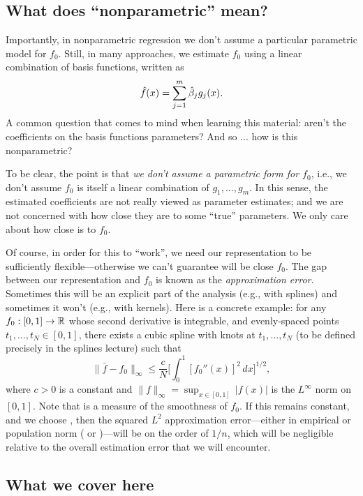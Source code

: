 \documentclass{article}
\begin{document}
\subsection{What does ``nonparametric'' mean?}

Importantly, in nonparametric regression we don't assume a particular parametric
model for $f_0$. Still, in many approaches, we estimate $f_0$ using a linear
combination of basis functions, written as   
\[
\hat{f}(x) = \sum_{j=1}^m \hat{\beta}_j g_j(x). 
\]
A common question that comes to mind when learning this material: aren't the
coefficients on the basis functions parameters? And so ... how is this
nonparametric?      

To be clear, the point is that \emph{we don't assume a parametric form for
  $f_0$}, i.e., we don't assume $f_0$ is itself a linear combination of
$g_1,\dots,g_m$. In this sense, the estimated coefficients
 are not really viewed as parameter estimates; 
and we are not concerned with how close they are to some ``true'' parameters. We 
only care about how close \smash{$\hf$} is to $f_0$.

Of course, in order for this to ``work'', we need our representation to be
sufficiently flexible---otherwise we can't guarantee \smash{$\hf$} will be close 
$f_0$. The gap between our representation and $f_0$ is known as the
\emph{approximation error}. Sometimes this will be an explicit part of the
analysis (e.g., with splines) and sometimes it won't (e.g., with kernels). Here
is a concrete example: for any $f_0 : [0,1] \to \mathbb{R}$ whose second derivative is
integrable, and evenly-spaced points $t_1,\dots,t_N \in [0,1]$, there exists a
cubic spline  with knots at $t_1,\dots,t_N$ (to be defined
precisely in the splines lecture) such that
\[
\|\bar{f} - f_0\|_\infty \leq \frac{c}{N} \bigg[ \int_0^1 [f_0''(x)]^2 \, dx
\bigg]^{1/2},  
\]
where $c>0$ is a constant and $\|f\|_\infty = \sup_{x \in [0,1]} \, |f(x)|$ is
the $L^\infty$ norm on $[0,1]$. Note that 
is a measure of the smoothness of $f_0$. If this remains constant, and we choose 
, then the squared $L^2$ approximation error---either in 
empirical or population norm ( or
)---will be on the order of $1/n$, which will be  
negligible relative to the overall estimation error that we will encounter.

\subsection{What we cover here}
\end{document}
